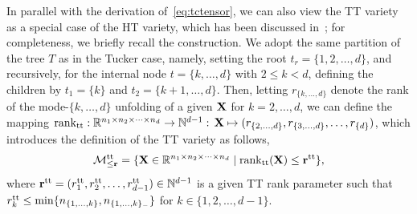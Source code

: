 In parallel with the derivation of~\eqref{eq:tctensor}, we can also view the TT variety as a special case of the HT variety, which has been discussed in~\cite[\S5]{uschmajew2013geometryofHT}; for completeness, we briefly recall the construction. We adopt the same partition of the tree $T$ as in the Tucker case, namely, setting the root $t_{r}=\{1,2,\ldots,d\}$, and recursively, for the internal node $t=\{k,\ldots,d\}$ with $2\le k<d$, defining the children by $t_1=\{k\}$ and $t_2=\{k+1,\ldots,d\}$. Then, letting $r_{\{k,\ldots,d\}}$ denote the rank of the mode-$\{k,\ldots,d\}$ unfolding of a given $\mathbf{X}$ for $k=2,\ldots,d$, we can define the mapping $\operatorname{rank}_{\mathrm{tt}}:\mathbb{R}^{n_1\times n_2\times\cdots\times n_d}\to \mathbb{N}^{d-1}:\,\mathbf{X}\mapsto(r_{\{2,\ldots,d\}},r_{\{3,\ldots,d\}},\ldots,r_{\{d\}})$, which introduces the definition of the TT variety as follows,
\begin{equation}\label{eq:tttensor}
    \mathcal{M}^{\mathrm{tt}}_{\le \mathbf{r}} = \{\mathbf{X}\in\mathbb{R}^{n_1\times n_2\times\cdots\times n_d} \mid \mathrm{rank}_{\mathrm{tt}}(\mathbf{X})\le\mathbf{r}^{\mathrm{tt}}\},
\end{equation}
where $\mathbf{r}^{\mathrm{tt}}=(r^{\mathrm{tt}}_1,r^{\mathrm{tt}}_2,\ldots, r^{\mathrm{tt}}_{d-1})\in\mathbb{N}^{d-1}$ is a given TT rank parameter such that $r^{\mathrm{tt}}_k\le\min\{n_{\{1,\ldots,k\}},n_{\{1,\ldots,k\}_-}\}$ for $k\in\{1,2,\ldots,d-1\}$.
